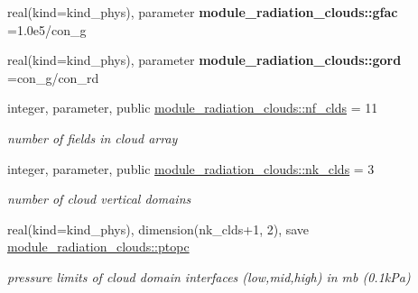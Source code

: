 \begin{DoxyCompactItemize}
\item 
\mbox{\label{group__module__radiation__clouds_gab4060544be25be2b0a87042fb3bd6242}} 
real(kind=kind\+\_\+phys), parameter {\bfseries module\+\_\+radiation\+\_\+clouds\+::gfac} =1.\+0e5/con\+\_\+g
\item 
\mbox{\label{group__module__radiation__clouds_ga50ea21222eb91e6363e8bf1338b34a66}} 
real(kind=kind\+\_\+phys), parameter {\bfseries module\+\_\+radiation\+\_\+clouds\+::gord} =con\+\_\+g/con\+\_\+rd
\item 
\mbox{\label{group__module__radiation__clouds_ga66cf0f94619a3d865b0c593197a30576}} 
integer, parameter, public \hyperlink{group__module__radiation__clouds_ga66cf0f94619a3d865b0c593197a30576}{module\+\_\+radiation\+\_\+clouds\+::nf\+\_\+clds} = 11
\begin{DoxyCompactList}\small\item\em number of fields in cloud array \end{DoxyCompactList}\item 
\mbox{\label{group__module__radiation__clouds_ga2739168b8205ee860eb8a160ea722a44}} 
integer, parameter, public \hyperlink{group__module__radiation__clouds_ga2739168b8205ee860eb8a160ea722a44}{module\+\_\+radiation\+\_\+clouds\+::nk\+\_\+clds} = 3
\begin{DoxyCompactList}\small\item\em number of cloud vertical domains \end{DoxyCompactList}\item 
\mbox{\label{group__module__radiation__clouds_ga03bc5d19cbdc84a2032c8d591ba4c96a}} 
real(kind=kind\+\_\+phys), dimension(nk\+\_\+clds+1, 2), save \hyperlink{group__module__radiation__clouds_ga03bc5d19cbdc84a2032c8d591ba4c96a}{module\+\_\+radiation\+\_\+clouds\+::ptopc}
\begin{DoxyCompactList}\small\item\em pressure limits of cloud domain interfaces (low,mid,high) in mb (0.\+1k\+Pa) \end{DoxyCompactList}\item 
\mbox{\label{group__module__radiation__clouds_gad4d5840310847f5bf39082114069ceb8}} 

\end{DoxyCompactItemize}
